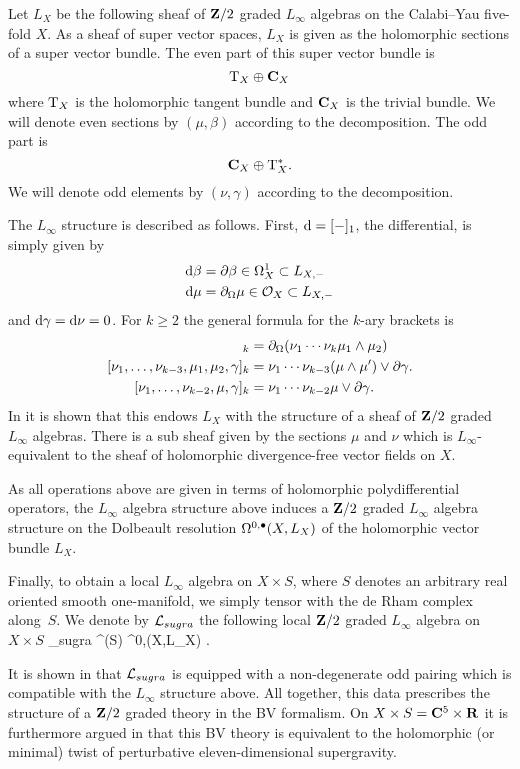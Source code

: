 Let $L_X$ be the following sheaf of $\mathbf{Z}/2$ graded $L_\infty$ algebras on the Calabi--Yau five-fold $X$.
As a sheaf of super vector spaces, $L_X$ is given as the holomorphic sections of a super vector bundle. 
The even part of this super vector bundle is
\[
{\rm T}_X \oplus \mathbf{C}_X 
\]
where ${\rm T}_X$ is the holomorphic tangent bundle and $\mathbf{C}_X$ is the trivial bundle.
We will denote even sections by $(\mu, \beta)$ according to the decomposition. 
The odd part is 
\[
\mathbf{C}_X \oplus {\rm T}^*_X .
\]
We will denote odd elements by $(\nu, \gamma)$ according to the decomposition. 

The $L_\infty$ structure is described as follows. 
First, ${\rm d} = [-]_1$, the differential, is simply given by 
\begin{align*}
{\rm d} \beta & = \partial \beta \in \Omega^1_X \subset L_{X,-} \\
{\rm d} \mu & = \partial_{\Omega} \mu \in \mathcal O_X \subset L_{X, -}
\end{align*}
and ${\rm d} \gamma = {\rm d} \nu = 0$. 
For $k \geq 2$ the general formula for the $k$-ary brackets is 
\begin{align*}
[\nu_1, \ldots, \nu_{k-2}, \mu_1,\mu_2]_{k} & = \div(\nu_1 \cdots \nu_k \mu_1 \wedge \mu_2) \\
[\nu_1,\ldots, \nu_{k-3}, \mu_1,\mu_2,\gamma]_k & = \nu_1 \cdots \nu_{k-3} (\mu \wedge \mu') \vee \del \gamma .\\
[\nu_1,\ldots,\nu_{k-2}, \mu, \gamma]_k & = \nu_1 \cdots \nu_{k-2} \mu \vee \del \gamma .
\end{align*}
In \cite{RSW} it is shown that this endows $L_{X}$ with the structure of a sheaf of $\mathbf{Z}/2$ graded $L_\infty$ algebras.
There is a sub sheaf given by the sections $\mu$ and $\nu$ which is $L_\infty$-equivalent to the sheaf of holomorphic divergence-free vector fields on $X$. 

As all operations above are given in terms of holomorphic polydifferential operators, the $L_\infty$ algebra structure above induces a $\mathbf{Z}/2$ graded $L_\infty$ algebra structure on the Dolbeault resolution $\Omega^{0,\bullet}(X,L_X)$ of the holomorphic vector bundle $L_X$.

Finally, to obtain a local $L_\infty$ algebra on $X \times S$, where $S$ denotes an arbitrary real oriented smooth one-manifold, we simply tensor with the de Rham complex along~$S$.
We denote by $\mathcal L_{sugra}$ the following local $\mathbf{Z}/2$ graded $L_\infty$ algebra on $X \times S$
\beqn
\cL_{sugra}  \Omega^\bu(S) \hotimes \Omega^{0,\bu}(X,L_X) .
\eeqn

\parsec[s:rsw]
It is shown in \cite{RSW} that $\mathcal L_{sugra}$ is equipped with a non-degenerate odd pairing which is compatible with the $L_\infty$ structure above. 
All together, this data prescribes the structure of a $\mathbf{Z}/2$ graded theory in the BV formalism. 
On $X \times S = \mathbf{C}^5 \times \mathbf{R}$ it is furthermore argued in \cite{RSW} that this BV theory is equivalent to the holomorphic (or minimal) twist of perturbative eleven-dimensional supergravity. 


